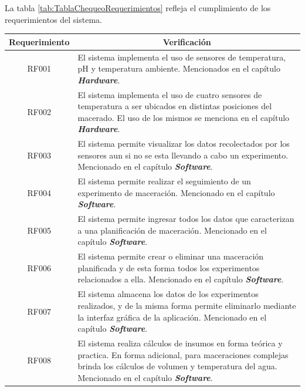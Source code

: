 \par La tabla \ref{tab:TablaChequeoRequerimientos} refleja el cumplimiento de los requerimientos del sistema.
 \begin{table}[H]
     \centering
     \begin{tabularx}{\textwidth}{|X|X|}
     \hline
     \multicolumn{1}{|c|}{Requerimiento} & \multicolumn{1}{|c|}{Verificación}\\
     \hline
     \hline
        \multicolumn{1}{|c|}{RF001}  & El sistema implementa el uso de sensores de temperatura, pH y temperatura ambiente. Mencionados en el capítulo \textit{\textbf{Hardware}}. \\
        \hline
        \multicolumn{1}{|c|}{RF002}  & El sistema implementa el uso de cuatro sensores de temperatura a ser ubicados en distintas posiciones del macerado. El uso de los mismos se menciona en el capítulo \textit{\textbf{Hardware}}. \\
        \hline
        \multicolumn{1}{|c|}{RF003}  & El sistema permite visualizar los datos recolectados por los sensores aun si no se esta llevando a cabo un experimento. Mencionado en el capítulo \textit{\textbf{Software}}. \\
        \hline
        \multicolumn{1}{|c|}{RF004}  & El sistema permite realizar el seguimiento de un experimento de maceración.  Mencionado en el capítulo \textit{\textbf{Software}}.   \\
        \hline
        \multicolumn{1}{|c|}{RF005}  & El sistema permite ingresar todos los datos que caracterizan a una planificación de maceración. Mencionado en el capítulo \textit{\textbf{Software}}.  \\
        \hline
        \multicolumn{1}{|c|}{RF006}  & El sistema permite crear o eliminar una maceración planificada y de esta forma todos los experimentos relacionados a ella. Mencionado en el capítulo \textit{\textbf{Software}}. \\
        \hline
        \multicolumn{1}{|c|}{RF007}  & El sistema almacena los datos de los experimentos realizados, y de la misma forma permite eliminarlo mediante la interfaz gráfica de la aplicación. Mencionado en el capítulo \textit{\textbf{Software}}. \\
        \hline
        \multicolumn{1}{|c|}{RF008}  & El sistema realiza cálculos de insumos en forma teórica y practica. En forma adicional, para maceraciones complejas brinda los cálculos de volumen y temperatura del agua. Mencionado en el capítulo \textit{\textbf{Software}}. \\

\end{tabularx}
\end{table}
